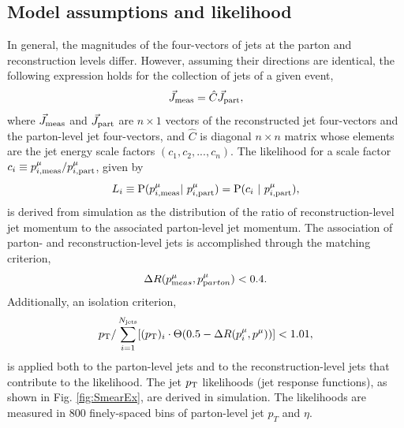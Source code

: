 \subsection{Model assumptions and likelihood} 
In general, the magnitudes of the four-vectors of jets at the parton and reconstruction levels differ. However, assuming their directions are identical, the following expression holds for the collection of jets of a given event,
\begin{equation}
\vec{J}_{\rm meas} = \hat{C} \vec{J}_{\rm part},
\end{equation}
where $\vec{J}_{\rm meas}$ and $\vec{J}_{\rm part}$ are $n\times 1$ vectors of the reconstructed jet four-vectors and the parton-level jet four-vectors, and $\hat{C}$ is diagonal $n\times n$ matrix whose elements are the jet energy scale factors $(c_1,c_2,...,c_n)$. The likelihood for a scale factor $c_i\equiv p^{\mu}_{i,\rm meas}/p^{\mu}_{i,\rm part}$, given by
\begin{equation}
L_{i}\equiv{\rm P}(p^{\mu}_{i,\rm meas}|\ p^{\mu}_{i,\rm part})={\rm P}(c_i\ |\ p^{\mu}_{i,\rm part}),
\label{eq:JetEnergyLikelihood}
\end{equation}
is derived from simulation as the distribution of the ratio of reconstruction-level jet momentum to the associated parton-level jet momentum. The association of parton- and reconstruction-level jets is accomplished through the matching criterion,
\begin{equation}
\Delta R(p^{\mu}_{\textrm meas},p^{\mu}_{\textrm parton})<0.4.
\end{equation}	
Additionally, an isolation criterion,
\begin{equation}
p_{\rm T}/\sum_{i=1}^{N_{\rm jets}}[(p_{\rm T})_{i}\cdot\Theta(0.5-\Delta R(p^{\mu}_{i},p^{\mu}))]<1.01,
\end{equation}
is applied both to the parton-level jets and to the reconstruction-level jets that contribute to the likelihood. The jet $p_{\text{T}}$ likelihoods (jet response functions), as shown in Fig. \ref{fig:SmearEx}, are derived in simulation. The likelihoods are measured in 800 finely-spaced bins of parton-level jet $p_T$ and $\eta$.
